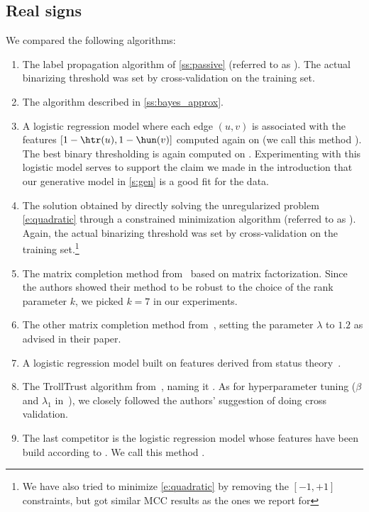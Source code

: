 \subsection{Real signs} 
We compared the following algorithms:

\begin{enumerate}[label=\textbf{\arabic*.}]
  \item The label propagation algorithm of \autoref{ss:passive} (referred to as \uslpropGsec{}).
    The actual binarizing threshold was set by cross-validation on the training set.

  \item The \usrule{} algorithm described in \autoref{ss:bayes_approx}.

  \item A logistic regression model where each edge $(u,v)$ is associated with the features
    $[1-\htr(u), 1-\hun(v)]$ computed again on \trainset{} (we call this method \uslogregp{}). The best
    binary thresholding is again computed on \trainset{}. Experimenting with this logistic model
    serves to support the claim we made in the introduction that our generative model in
    \autoref{s:gen} is a good fit for the data.

  \item  The solution obtained by directly solving the unregularized problem \eqref{e:quadratic}
    through a constrained minimization algorithm (referred to as \qoptim{}). Again, the actual
    binarizing threshold was set by cross-validation on the training set.\footnote{We have also
    tried to minimize \eqref{e:quadratic} by removing the $[-1,+1]$ constraints, but got similar MCC
    results as the ones we report for \qoptim{}}

  \item  The matrix completion method from~\autocite{LowRankCompletion14} based on \complowrank{}
    matrix factorization. Since the authors showed their method to be robust to the choice of the
    rank parameter $k$, we picked $k=7$ in our experiments.

  \item The other \compmaxnorm{} matrix completion method from~\autocite{OnlineCompletion17},
    setting the parameter $\lambda$ to $1.2$ as advised in their paper.

  \item A logistic regression model built on \comptriads{} features derived from status
    theory~\autocite{Leskovec2010}.

  \item The TrollTrust algorithm from~\autocite{wu2016troll}, naming it \compranknodes{}. As for
    hyperparameter tuning ($\beta$ and $\lambda_1$ in~\autocite{wu2016troll}), we closely followed
    the authors' suggestion of doing cross validation.

  \item  The last competitor is the logistic regression model whose features have been build
    according to \autocite{Bayesian15}. We call this method \compbayesian{}.
\end{enumerate}

